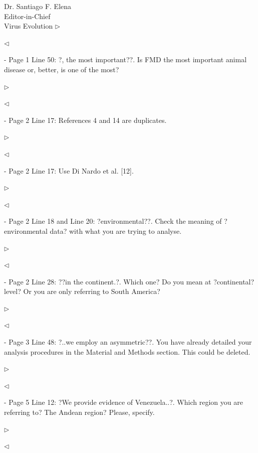 \documentclass[ucla,biomath,12pt,noaddrfooter,datefrom]{UC_letter}
\newenvironment{reply}{$\triangleright$\bf}{$\triangleleft$}
\begin{document}
\begin{letter}{
Dr. Santiago F. Elena \\
Editor-in-Chief \\
Virus Evolution
}
\begin{reply}

\end{reply}

-       Page 1 Line 50: ?, the most important??. 
Is FMD the most important animal disease or, better, is one of the most?

\begin{reply}

\end{reply}

-       Page 2 Line 17: References 4 and 14 are duplicates.

\begin{reply}

\end{reply}

-       Page 2 Line 17: Use Di Nardo et al. [12].

\begin{reply}

\end{reply}

-       Page 2 Line 18 and Line 20: ?environmental??. 
Check the meaning of ?environmental data? with what you are trying to analyse.

\begin{reply}

\end{reply}

-       Page 2 Line 28: ??in the continent.?. 
Which one? 
Do you mean at ?continental? level? 
Or you are only referring to South America?

\begin{reply}

\end{reply}

-       Page 3 Line 48: ?..we employ an asymmetric??. 
You have already detailed your analysis procedures in the Material and Methods section. 
This could be deleted.

\begin{reply}

\end{reply}

-       Page 5 Line 12: ?We provide evidence of Venezuela..?. 
Which region you are referring to? 
The Andean region? 
Please, specify.

\begin{reply}

\end{reply}


\end{letter}
\end{document}
